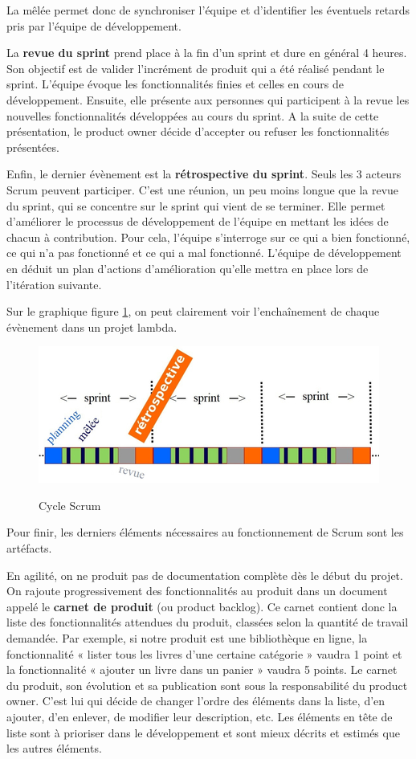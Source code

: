 \documentclass[12pt]{report}
\begin{document}
La mêlée permet donc de synchroniser l'équipe et d'identifier les éventuels retards pris par l'équipe de développement.

La \textbf{revue du sprint} prend place à la fin d'un sprint et dure en général 4 heures. Son objectif est de valider l'incrément de produit qui a été réalisé pendant le sprint.
L'équipe évoque les fonctionnalités finies et celles en cours de développement. Ensuite, elle présente aux personnes qui participent à la revue les nouvelles fonctionnalités développées au cours du sprint.
A la suite de cette présentation, le product owner décide d'accepter ou refuser les fonctionnalités présentées\cite{wikiscrum}.

Enfin, le dernier évènement est la \textbf{rétrospective du sprint}. Seuls les 3 acteurs Scrum peuvent participer. C'est une réunion, un peu moins longue que la revue du sprint, qui se concentre sur le sprint qui vient de se terminer. Elle permet d'améliorer le processus de développement de l'équipe en mettant les idées de chacun à contribution. Pour cela, l'équipe s'interroge sur ce qui a bien fonctionné, ce qui n'a pas fonctionné et ce qui a mal fonctionné\cite{gitagile}. L'équipe de développement en déduit un plan d'actions d'amélioration qu'elle mettra en place lors de l'itération suivante.

Sur le graphique figure \ref{fig:scrum}, on peut clairement voir l'enchaînement de chaque évènement dans un projet lambda.
\begin{figure}[htp]
  \centering
  \includegraphics[scale=0.8]{images/events_scrum}\cite{agiscrum}
  \caption{Cycle Scrum}
  \label{fig:scrum}
\end{figure}

Pour finir, les derniers éléments nécessaires au fonctionnement de Scrum sont les artéfacts.

En agilité, on ne produit pas de documentation complète dès le début du projet. On rajoute progressivement des fonctionnalités au produit dans un document appelé le \textbf{carnet de produit} (ou product backlog)\cite{wikiscrum}. Ce carnet contient donc la liste des fonctionnalités attendues du produit, classées selon la quantité de travail demandée. Par exemple, si notre produit est une bibliothèque en ligne, la fonctionnalité « lister tous les livres d'une certaine catégorie » vaudra 1 point et la fonctionnalité « ajouter un livre dans un panier » vaudra 5 points. Le carnet du produit, son évolution et sa publication sont sous la responsabilité du product owner. C'est lui qui décide de changer l'ordre des éléments dans la liste, d'en ajouter, d'en enlever, de modifier leur description, etc. Les éléments en tête de liste sont à prioriser dans le développement et sont mieux décrits et estimés que les autres éléments.
\end{document}

